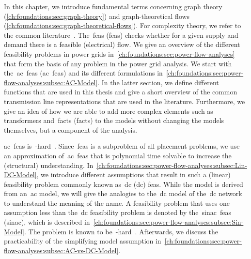 \label{ch:foundations}
\glsresetall
% 
In this chapter, we introduce fundamental terms concerning graph theory
(\cref{ch:foundations:sec:graph-theory}) and graph-theoretical flows
(\cref{ch:foundations:sec:graph-theoretical-flows}). For complexity theory, we
refer to the common literature~\parencite{Gar79,Aus99}. 
% 
The~\acrlong{feas} (\gls{feas}) checks whether for a given supply and demand
there is a feasible (electrical) flow. We give an overview of the different
feasibility problems in power grids
in~\cref{ch:foundations:sec:power-flow-analyses} that form the basis of any
problem in the power grid analysis. We start with
the~\acrlong{ac}~\acrlong{feas} (\gls{ac}~\gls{feas}) and its different
formulations in~\cref{ch:foundations:sec:power-flow-analyses:subsec:AC-Model}.
In the latter section, we define different functions that are used in this
thesis and give a short overview of the common transmission line representations
that are used in the literature. Furthermore, we give an idea of how we are able
to add more complex elements such as transformers and~\acrlong{facts}
(\gls{facts}) to the models without changing the models themselves, but a
component of the analysis.

\gls{ac}~\gls{feas} is~\NP-hard~\parencite{Ver10,Leh16}. Since~\gls{feas} is a
subproblem of all placement problems, we use an approximation
of~\gls{ac}~\gls{feas} that is polynomial time solvable to increase the
(structural) understanding.
In~\cref{ch:foundations:sec:power-flow-analyses:subsec:Lin-DC-Model}, we
introduce different assumptions that result in such a (linear) feasibility
problem commonly known as~\acrlong{dc} (\gls{dc}) \gls{feas}. While the model is
derived from an~\gls{ac} model, we will give the analogies to the~\gls{dc} model
of the~\gls{dc} network to understand the meaning of the name. A feasibility
problem that uses one assumption less than the~\gls{dc} feasibility problem is
denoted by the~\acrlong{sinac}~\gls{feas} (\gls{sinac}), which is described
in~\cref{ch:foundations:sec:power-flow-analyses:subsec:Sin-Model}. The problem
is known to be~\NP-hard~\parencite{Ver10,Bie19}. Afterwards, we discuss the
practicability of the simplifying model assumption
in~\cref{ch:foundations:sec:power-flow-analyses:subsec:AC-vs-DC-Model}.
% 
% 
